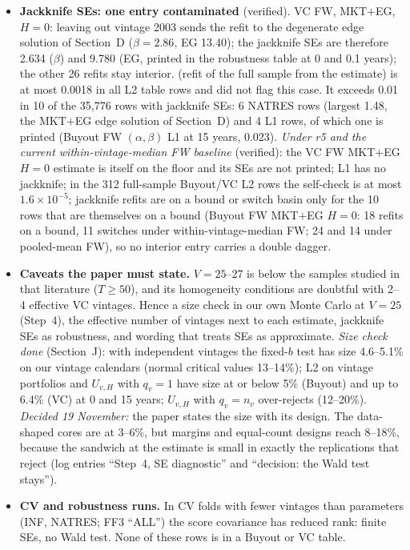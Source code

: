 \documentclass[11pt]{article}
\newcommand{\code}[1]{\texttt{\detokenize{#1}}}
\begin{document}
\begin{itemize}
\item \textbf{Jackknife SEs: one entry contaminated} (verified). VC FW, MKT$+$EG, $H=0$: leaving out vintage 2003 sends the refit to the degenerate edge solution of Section~D ($\beta=2.86$, EG 13.40); the jackknife SEs are therefore 2.634 ($\beta$) and 9.780 (EG, printed in the robustness table at 0 and 0.1 years); the other 26 refits stay interior. \code{jk.selfcheck} (refit of the full sample from the estimate) is at most 0.0018 in all L2 table rows and did not flag this case. It exceeds 0.01 in 10 of the 35{,}776 rows with jackknife SEs: 6 NATRES rows (largest 1.48, the MKT$+$EG edge solution of Section~D) and 4 L1 rows, of which one is printed (Buyout FW $(\alpha,\beta)$ L1 at 15 years, 0.023). \emph{Under r5 and the current within-vintage-median FW baseline} (verified): the VC FW MKT$+$EG $H=0$ estimate is itself on the floor and its SEs are not printed; L1 has no jackknife; in the 312 full-sample Buyout/VC L2 rows the self-check is at most $1.6\times10^{-5}$; jackknife refits are on a bound or switch basin only for the 10 rows that are themselves on a bound (Buyout FW MKT$+$EG $H=0$: 18 refits on a bound, 11 switches under within-vintage-median FW; 24 and 14 under pooled-mean FW), so no interior entry carries a double dagger.
\item \textbf{Caveats the paper must state.} $V=25$--27 is below the samples studied in that literature ($T\ge 50$), and its homogeneity conditions are doubtful with 2--4 effective VC vintages. Hence a size check in our own Monte Carlo at $V=25$ (Step~4), the effective number of vintages next to each estimate, jackknife SEs as robustness, and wording that treats SEs as approximate. \emph{Size check done} (Section~J): with independent vintages the fixed-$b$ test has size 4.6--5.1\% on our vintage calendars (normal critical values 13--14\%); L2 on vintage portfolios and $U_{v,H}$ with $q_v=1$ have size at or below 5\% (Buyout) and up to 6.4\% (VC) at 0 and 15 years; $U_{v,H}$ with $q_v=n_v$ over-rejects (12--20\%). \emph{Decided 19 November:} the paper states the size with its design. The data-shaped cores are at 3--6\%, but margins and equal-count designs reach 8--18\%, because the sandwich at the estimate is small in exactly the replications that reject (log entries ``Step~4, SE diagnostic'' and ``decision: the Wald test stays'').
\item \textbf{CV and robustness runs.} In CV folds with fewer vintages than parameters (INF, NATRES; FF3 ``ALL'') the score covariance has reduced rank: finite SEs, no Wald test. None of these rows is in a Buyout or VC table.
\end{itemize}
\end{document}
